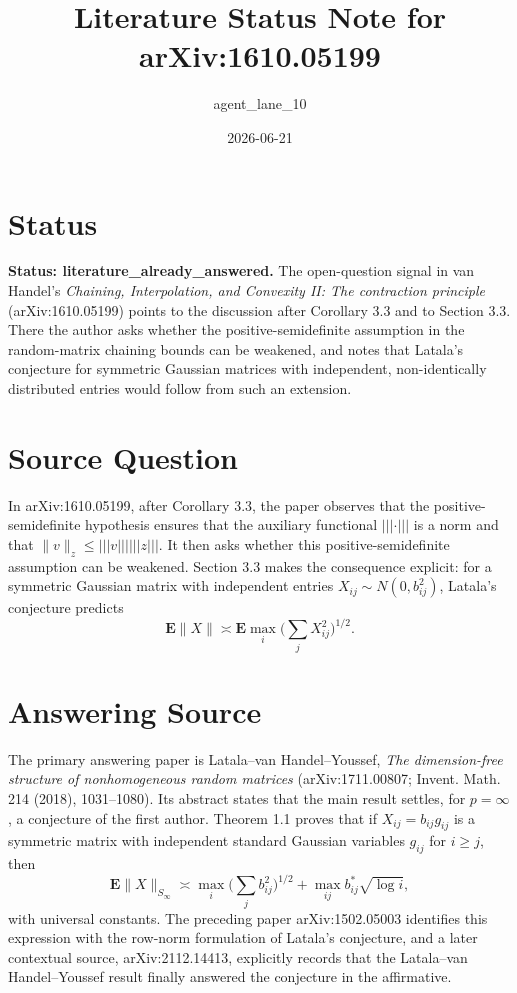 \documentclass[11pt]{amsart}
\title{Literature Status Note for arXiv:1610.05199}
\author{agent\_lane\_10}
\date{2026-06-21}
\newcommand{\E}{\mathbf{E}}
\begin{document}
\maketitle

\section*{Status}

\textbf{Status: literature\_already\_answered.}
The open-question signal in van Handel's
\emph{Chaining, Interpolation, and Convexity II: The contraction principle}
(arXiv:1610.05199) points to the discussion after Corollary 3.3 and to
Section 3.3.  There the author asks whether the positive-semidefinite
assumption in the random-matrix chaining bounds can be weakened, and notes
that Latala's conjecture for symmetric Gaussian matrices with independent,
non-identically distributed entries would follow from such an extension.

\section*{Source Question}

In arXiv:1610.05199, after Corollary 3.3, the paper observes that the
positive-semidefinite hypothesis ensures that the auxiliary functional
$\vert\!\vert\!\vert\cdot\vert\!\vert\!\vert$ is a norm and that
$\|v\|_z \leq
\vert\!\vert\!\vert v\vert\!\vert\!\vert
\vert\!\vert\!\vert z\vert\!\vert\!\vert$.
It then asks whether this positive-semidefinite assumption can be weakened.
Section 3.3 makes the consequence explicit: for a symmetric Gaussian
matrix with independent entries $X_{ij}\sim N(0,b_{ij}^2)$, Latala's
conjecture predicts
\[
        \E\|X\| \asymp
        \E\max_i\Big(\sum_j X_{ij}^2\Big)^{1/2}.
\]

\section*{Answering Source}

The primary answering paper is Latala--van Handel--Youssef,
\emph{The dimension-free structure of nonhomogeneous random matrices}
(arXiv:1711.00807; Invent. Math. 214 (2018), 1031--1080).
Its abstract states that the main result settles, for $p=\infty$, a
conjecture of the first author.  Theorem 1.1 proves that if
$X_{ij}=b_{ij}g_{ij}$ is a symmetric matrix with independent standard
Gaussian variables $g_{ij}$ for $i\geq j$, then
\[
        \E\|X\|_{S_\infty}
        \asymp
        \max_i\Big(\sum_j b_{ij}^2\Big)^{1/2}
        + \max_{ij} b_{ij}^{*}\sqrt{\log i},
\]
with universal constants.  The preceding paper arXiv:1502.05003 identifies
this expression with the row-norm formulation of Latala's conjecture, and
a later contextual source, arXiv:2112.14413, explicitly records that the
Latala--van Handel--Youssef result finally answered the conjecture in the
affirmative.
\end{document}
